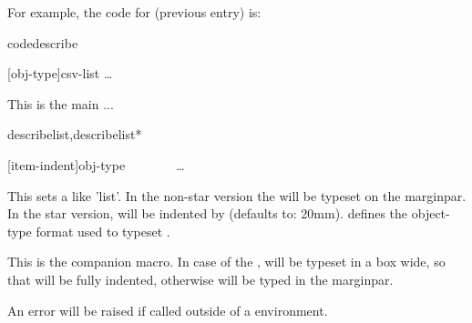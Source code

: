 \documentclass{article}
\begin{document}
For example, the code for   (previous entry) is:

\begin{codestore}[demoD]
\begin{codedescribe}[env,new=2023/05/01,update=2023/05/01,note={a note example},update=2024/02/16]{codedescribe}
  \begin{codesyntax}
    \tsmacro{\begin{codedescribe}}[obj-type]{csv-list}
    \ldots
    \tsmacro{\end{codedescribe}}{}
  \end{codesyntax}
  This is the main ...
\end{codedescribe}
\end{codestore}  


\begin{codedescribe}[env]{describelist,describelist*}
  \begin{codesyntax}
\tsmacro{\begin{describelist}}[item-indent]{obj-type}
  ~~
  ~~
  ~~\ldots
\tsmacro{\end{describelist}}{}
  \end{codesyntax}
This sets a  like 'list'. In the non-star version the  will be typeset on the marginpar. In the star version,  will be indented by  (defaults to: 20mm).
 defines the object-type format used to typeset . 
\end{codedescribe}

\begin{codedescribe}[code]{\describe}
\begin{codesyntax}
\end{codesyntax}
This is the  companion macro. In case of the ,  will be typeset in a box  wide, so that  will be fully indented, otherwise  will be typed in the marginpar.
\end{codedescribe}

\begin{tsremark}
An error will be raised if called outside of a  environment.
\end{tsremark}
\end{document}
